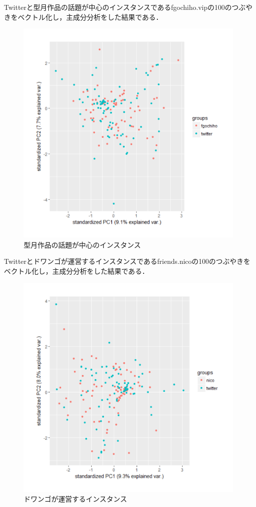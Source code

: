 Twitterと型月作品の話題が中心のインスタンスであるfgochiho.vipの100のつぶやきをベクトル化し，主成分分析をした結果である．
\begin{figure}[h]
\centering
\includegraphics[width=13cm,clip]{fgochiho.pdf}
\caption{型月作品の話題が中心のインスタンス}\label{fgochiho}
\end{figure}
\newpage

Twitterとドワンゴが運営するインスタンスであるfriends.nicoの100のつぶやきをベクトル化し，主成分分析をした結果である．
\begin{figure}[h]
\centering
\includegraphics[width=13cm,clip]{nico.pdf}
\caption{ドワンゴが運営するインスタンス}\label{nico}
\end{figure}
\newpage

